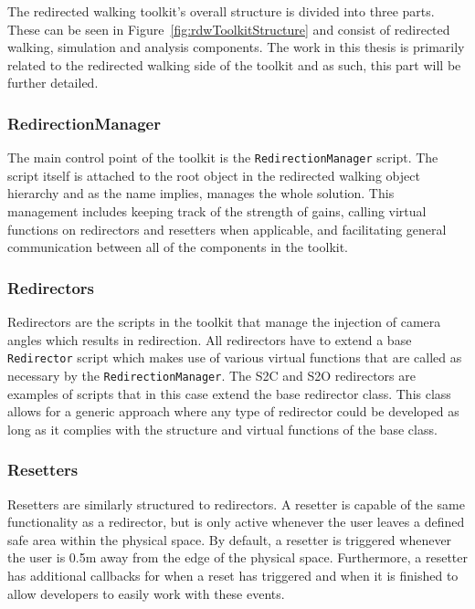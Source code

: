 The redirected walking toolkit's overall structure is divided into three parts. These can be seen in Figure~\ref{fig:rdwToolkitStructure} and consist of redirected walking, simulation and analysis components. The work in this thesis is primarily related to the redirected walking side of the toolkit and as such, this part will be further detailed. 

\subsubsection{RedirectionManager}
The main control point of the toolkit is the \lstinline{RedirectionManager} script. The script itself is attached to the root object in the redirected walking object hierarchy and as the name implies, manages the whole solution. This management includes keeping track of the strength of gains, calling virtual functions on redirectors and resetters when applicable, and facilitating general communication between all of the components in the toolkit. 

\subsubsection{Redirectors}
Redirectors are the scripts in the toolkit that manage the injection of camera angles which results in redirection. All redirectors have to extend a base \lstinline{Redirector} script which makes use of various virtual functions that are called as necessary by the \lstinline{RedirectionManager}. The S2C and S2O redirectors are examples of scripts that in this case extend the base redirector class. This class allows for a generic approach where any type of redirector could be developed as long as it complies with the structure and virtual functions of the base class. 

\subsubsection{Resetters}
Resetters are similarly structured to redirectors. A resetter is capable of the same functionality as a redirector, but is only active whenever the user leaves a defined safe area within the physical space. By default, a resetter is triggered whenever the user is 0.5m away from the edge of the physical space. Furthermore, a resetter has additional callbacks for when a reset has triggered and when it is finished to allow developers to easily work with these events. 
